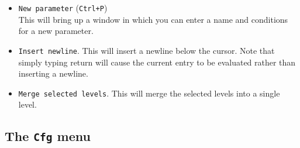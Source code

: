 \documentclass[a4paper,11pt]{book}
\begin{document}
\begin{itemize}
  \item \texttt{New parameter} (\texttt{Ctrl+P})\\
  This will bring up a window in which you can enter a name and
  conditions for a new parameter.

  \item \texttt{Insert newline}.
  This will insert a newline below the cursor.  Note that simply
  typing return will cause the current entry to be evaluated rather
  than inserting a newline.

  \item \texttt{Merge selected levels}.
  This will merge the selected levels into a single level.
\end{itemize}

\subsection{The \texttt{Cfg} menu}
\end{document}
